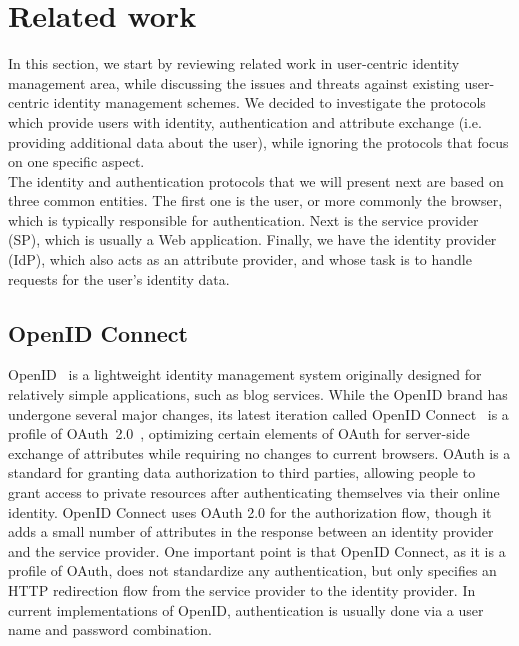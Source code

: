 \section{Related work}
\label{sec:identity_sota}
In this section, we start by reviewing related work in user-centric identity management area, while discussing the issues and threats against existing user-centric identity management schemes. We decided to investigate the protocols which provide users with identity, authentication and attribute exchange (i.e. providing additional data about the user), while ignoring the protocols that focus on one specific aspect.\\

The identity and authentication protocols that we will present next are based on three common entities. The first one is the user, or more commonly the browser, which is typically responsible for authentication. Next is the service provider (SP), which is usually a Web application. Finally, we have the identity provider (IdP), which also acts as an attribute provider, and whose task is to handle requests for the user's identity data.


\subsection{OpenID Connect}
\label{subsec:openid}
OpenID~\cite{recordon2006openid} is a lightweight identity management system originally designed for relatively simple applications, such as blog services. While the OpenID brand has undergone several major changes, its latest iteration called OpenID Connect~\cite{sakimura2011openid} is a profile of OAuth~2.0~\cite{hammer2011oauth}, optimizing certain elements of OAuth for server-side exchange of attributes while requiring no changes to current browsers. OAuth is a standard for granting data authorization to third parties, allowing people to grant access to private resources after authenticating themselves via their online identity. OpenID Connect uses OAuth 2.0 for the authorization flow, though it adds a small number of attributes in the response between an identity provider and the service provider. One important point is that OpenID Connect, as it is a profile of OAuth, does not standardize any authentication, but only specifies an HTTP redirection flow from the service provider to the identity provider. In current implementations of OpenID, authentication is usually done via a user name and password combination.\\

